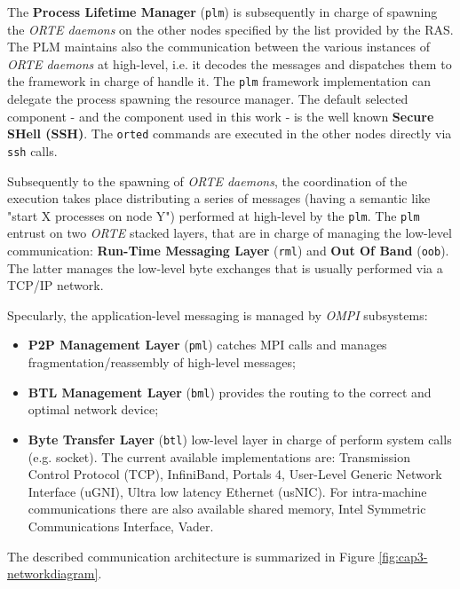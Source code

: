The \textbf{Process Lifetime Manager} (\texttt{plm}) is subsequently in charge 
of spawning
the \emph{ORTE daemons} on the other nodes specified by the list provided by the RAS.
The PLM maintains also the communication between the various instances of
\emph{ORTE daemons} at high-level, i.e. it decodes the messages and dispatches them to
the framework in charge of handle it. The \texttt{plm} framework implementation can delegate the process spawning the
resource manager. The default selected
component - and the component used in this work - is the well known 
\textbf{Secure SHell (SSH)}.
The \texttt{orted} commands are executed in the other nodes directly via
\texttt{ssh} calls.

Subsequently to the spawning of \emph{ORTE daemons}, the coordination of the execution
takes place distributing a series of messages (having a semantic like "start X
processes on node Y")
performed at high-level by the \texttt{plm}. The \texttt{plm} entrust on two
\emph{ORTE} stacked layers, that are in charge of managing the low-level
communication: \textbf{Run-Time Messaging Layer} (\texttt{rml}) and
\textbf{Out Of Band} (\texttt{oob}). The latter manages the low-level byte
exchanges that is usually performed via a TCP/IP network.

Specularly, the application-level messaging is managed by \emph{OMPI} subsystems:
\begin{itemize}
\item \textbf{P2P Management Layer} (\texttt{pml}) catches MPI calls and manages
      fragmentation/reassembly of high-level messages;
\item \textbf{BTL Management Layer} (\texttt{bml}) provides the routing to the
      correct and optimal network device;
\item \textbf{Byte Transfer Layer} (\texttt{btl}) low-level layer in charge of
      perform system calls (e.g. socket). The current available implementations
      are: Transmission Control Protocol (TCP), InfiniBand, Portals 4,
      User-Level Generic Network Interface (uGNI), Ultra low latency Ethernet
      (usNIC).
      For intra-machine communications there are also available shared memory,    
      Intel Symmetric Communications Interface,  Vader.
\end{itemize}



The described communication architecture is summarized in Figure
\ref{fig:cap3-networkdiagram}.


